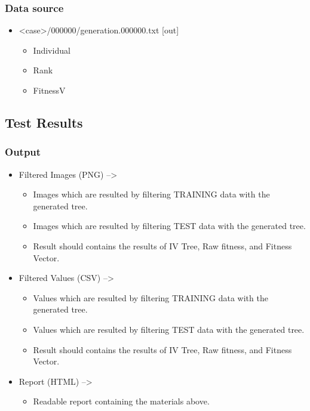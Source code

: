 \documentclass[]{article}
\begin{document}
\subsubsection{Data source}\label{data-source-2}

\begin{itemize}
\itemsep1pt\parskip0pt
\item
  \textless{}case\textgreater{}/000000/generation.000000.txt {[}out{]}

  \begin{itemize}
  \itemsep1pt\parskip0pt
  \item
    Individual
  \item
    Rank
  \item
    FitnessV
  \end{itemize}
\end{itemize}

\subsection{Test Results}\label{test-results}

\subsubsection{Output}\label{output-3}

\begin{itemize}
\itemsep1pt\parskip0pt
\item
  Filtered Images (PNG) --\textgreater{}

  \begin{itemize}
  \itemsep1pt\parskip0pt
  \item
    Images which are resulted by filtering TRAINING data with the
    generated tree.
  \item
    Images which are resulted by filtering TEST data with the generated
    tree.
  \item
    Result should contains the results of IV Tree, Raw fitness, and
    Fitness Vector.
  \end{itemize}
\item
  Filtered Values (CSV) --\textgreater{}

  \begin{itemize}
  \itemsep1pt\parskip0pt
  \item
    Values which are resulted by filtering TRAINING data with the
    generated tree.
  \item
    Values which are resulted by filtering TEST data with the generated
    tree.
  \item
    Result should contains the results of IV Tree, Raw fitness, and
    Fitness Vector.
  \end{itemize}
\item
  Report (HTML) --\textgreater{}

  \begin{itemize}
  \itemsep1pt\parskip0pt
  \item
    Readable report containing the materials above.
  \end{itemize}
\end{itemize}
\end{document}
